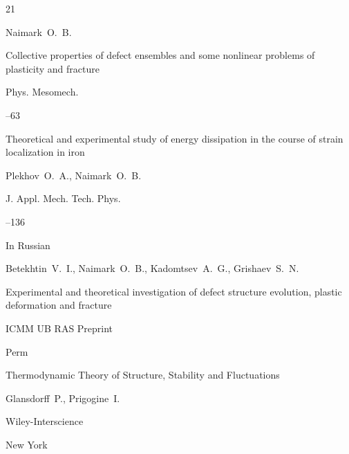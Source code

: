 \begin{thebibliography}{21}




\by Naimark~O.~B.

\paper Collective properties of defect ensembles and some nonlinear problems of plasticity and fracture

\jour Phys. Mesomech.




--63




\paper Theoretical and experimental study of energy dissipation in the course of strain localization in iron

\by Plekhov~O.~A., Naimark~O.~B.

\jour  J. Appl. Mech. Tech. Phys.




--136







\lang In Russian

\by Betekhtin~V.~I., Naimark~O.~B., Kadomtsev~A.~G., Grishaev~S.~N.

\preprint Experimental and theoretical investigation of defect structure evolution, plastic deformation and fracture 

\preprintinfo  ICMM UB RAS Preprint

\publaddr Perm












\book Thermodynamic Theory of Structure, Stability and Fluctuations

\by Glansdorff~P.,  Prigogine~I.

\publ Wiley-Interscience

\publaddr New York


\end{thebibliography}
